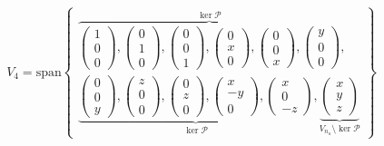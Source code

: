 \begin{equation}
    V_4 = \mathrm{span} 
    \begin{Bmatrix}
        \overbrace{
            \begin{pmatrix} 1 \\ 0 \\ 0 \end{pmatrix},
            \begin{pmatrix} 0 \\ 1 \\ 0 \end{pmatrix},
            \begin{pmatrix} 0 \\ 0 \\ 1 \end{pmatrix},
            \begin{pmatrix} 0 \\ x \\ 0 \end{pmatrix},
            \begin{pmatrix} 0 \\ 0 \\ x \end{pmatrix},
            \begin{pmatrix} y \\ 0 \\ 0 \end{pmatrix}
        }^{\ker \mathcal P},
            \\
        \underbrace{
            \begin{pmatrix} 0 \\ 0 \\ y \end{pmatrix},
            \begin{pmatrix} z \\ 0 \\ 0 \end{pmatrix},
            \begin{pmatrix} 0 \\ z \\ 0 \end{pmatrix},
            \begin{pmatrix} x \\-y \\ 0 \end{pmatrix},
            \begin{pmatrix} x \\ 0 \\-z \end{pmatrix}
        }_{\ker \mathcal P}, 
        \underbrace{
            \begin{pmatrix} x \\ y \\ z \end{pmatrix}
        }_{V_{n_u}\setminus \ker \mathcal P}
    \end{Bmatrix}
\end{equation}

